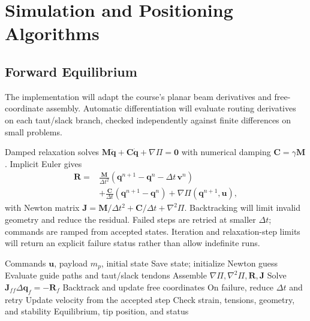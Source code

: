 \documentclass[letterpaper,10pt,conference]{ieeeconf}
\newcommand{\vct}[1]{\boldsymbol{#1}}
\begin{document}
\section{Simulation and Positioning Algorithms}
\subsection{Forward Equilibrium}
The implementation will adapt the course's planar beam derivatives
and free-coordinate assembly. Automatic differentiation will evaluate
routing derivatives on each taut/slack branch, checked independently
against finite differences on small problems.

Damped relaxation solves
$\vct{M}\ddot{\vct{q}}+\vct{C}\dot{\vct{q}}+\nabla\Pi=\vct{0}$
with numerical damping $\vct{C}=\gamma\vct{M}$. Implicit Euler gives
\begin{equation}
\begin{split}
\vct{R}={}&\frac{\vct{M}}{\Delta t^2}
(\vct{q}^{n+1}-\vct{q}^n-\Delta t\,\vct{v}^n)\\
&+\frac{\vct{C}}{\Delta t}(\vct{q}^{n+1}-\vct{q}^n)
+\nabla\Pi(\vct{q}^{n+1},\vct{u}),
\end{split}
\end{equation}
with Newton matrix
$\vct{J}=\vct{M}/\Delta t^2+\vct{C}/\Delta t+\nabla^2\Pi$.
Backtracking will limit invalid geometry and reduce the residual.
Failed steps are retried at smaller $\Delta t$; commands are ramped
from accepted states. Iteration and relaxation-step limits will return
an explicit failure status rather than allow indefinite runs.

\begin{algorithm}[t]
\caption{Forward Simulation to Static Equilibrium}
\begin{algorithmic}[1]
\Require Commands $\vct{u}$, payload $m_p$, initial state
  \Repeat
    \State Save state; initialize Newton guess
    \Repeat
      \State Evaluate guide paths and taut/slack tendons
      \State Assemble $\nabla\Pi,\nabla^2\Pi,\vct{R},\vct{J}$
      \State Solve $\vct{J}_{ff}\Delta\vct{q}_f=-\vct{R}_f$
      \State Backtrack and update free coordinates
    \State On failure, reduce $\Delta t$ and retry
    \State Update velocity from the accepted step
\EndFor
\State Check strain, tensions, geometry, and stability
\State \Return Equilibrium, tip position, and status
\end{algorithmic}
\end{algorithm}
\end{document}
